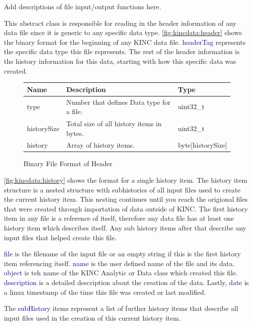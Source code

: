 \documentclass[10pt]{article}
\providecommand{\h}[1]{\textcolor{darkblue}{#1}}
\begin{document}
Add descriptions of file input/output functions here.

This abstract class is responsible for reading in the header information of any 
data file since it is generic to any specific data type. 
\autoref{fig:kincdata:header} shows the binary format for the beginning of any 
KINC data file. \h{headerTag} represents the specific data type this file 
represents. The rest of the header information is the history information for 
this data, starting with how this specific data was created.

\begin{figure}[H]
\begin{mdframed}[style=btable]
\begin{tabularx}{\textwidth}{|l|X|l|}
\hline
\textbf{Name} & \textbf{Description} & \textbf{Type} \\
\hline
type & Number that defines Data type for a file. & uint32\_t \\
\hline
historySize & Total size of all history items in bytes. & uint32\_t \\
\hline
history & Array of history items. & byte[historySize] \\
\hline
\end{tabularx}
\end{mdframed}
\caption{Binary File Format of Header}
\label{fig:kincdata:header}
\end{figure}

\autoref{fig:kincdata:history} shows the format for a single history item. The 
history item structure is a nested structure with subhistories of all input 
files used to create the current history item. This nesting continues until you 
reach the origional files that were created through importation of data outside 
of KINC. The first history item in any file is a reference of itself, therefore 
any data file has at least one history item which describes itself. Any sub 
history items after that describe any input files that helped create this file.

\h{file} is the filename of the input file or an empty string if this is the 
first history item referencing itself. \h{name} is the user defined name of the 
file and its data. \h{object} is teh name of the KINC Analytic or Data class 
which created this file. \h{description} is a detailed description about the 
creation of the data. Lastly, \h{date} is a linux timestamp of the time this 
file was created or last modified.

The \h{subHistory} items represent a list of further history items that 
describe all input files used in the creation of this current history item.
\end{document}
